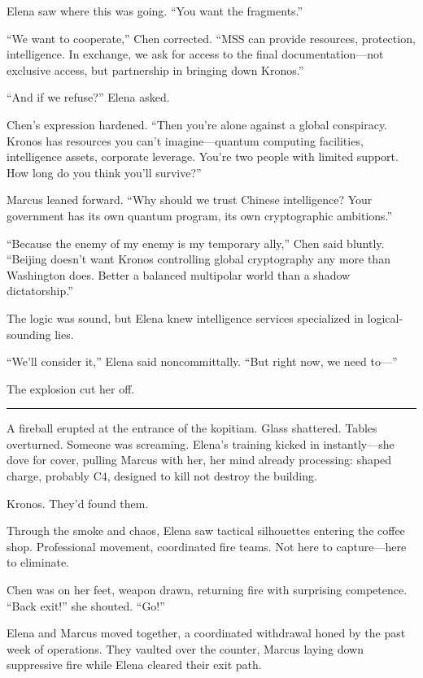 Elena saw where this was going. ``You want the fragments.''

``We want to cooperate,'' Chen corrected. ``MSS can provide resources, protection, intelligence. In exchange, we ask for access to the final documentation---not exclusive access, but partnership in bringing down Kronos.''

``And if we refuse?'' Elena asked.

Chen's expression hardened. ``Then you're alone against a global conspiracy. Kronos has resources you can't imagine---quantum computing facilities, intelligence assets, corporate leverage. You're two people with limited support. How long do you think you'll survive?''

Marcus leaned forward. ``Why should we trust Chinese intelligence? Your government has its own quantum program, its own cryptographic ambitions.''

``Because the enemy of my enemy is my temporary ally,'' Chen said bluntly. ``Beijing doesn't want Kronos controlling global cryptography any more than Washington does. Better a balanced multipolar world than a shadow dictatorship.''

The logic was sound, but Elena knew intelligence services specialized in logical-sounding lies.

``We'll consider it,'' Elena said noncommittally. ``But right now, we need to---''

The explosion cut her off.

\begin{center}\rule{0.5\linewidth}{0.5pt}\end{center}

A fireball erupted at the entrance of the kopitiam. Glass shattered. Tables overturned. Someone was screaming. Elena's training kicked in instantly---she dove for cover, pulling Marcus with her, her mind already processing: shaped charge, probably C4, designed to kill not destroy the building.

Kronos. They'd found them.

Through the smoke and chaos, Elena saw tactical silhouettes entering the coffee shop. Professional movement, coordinated fire teams. Not here to capture---here to eliminate.

Chen was on her feet, weapon drawn, returning fire with surprising competence. ``Back exit!'' she shouted. ``Go!''

Elena and Marcus moved together, a coordinated withdrawal honed by the past week of operations. They vaulted over the counter, Marcus laying down suppressive fire while Elena cleared their exit path.

